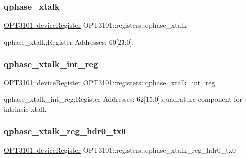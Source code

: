 \subsubsection{\texorpdfstring{qphase\+\_\+xtalk}{qphase\_xtalk}}
{\footnotesize\ttfamily \mbox{\hyperlink{class_o_p_t3101_1_1device_register}{O\+P\+T3101\+::device\+Register}} O\+P\+T3101\+::registers\+::qphase\+\_\+xtalk}



qphase\+\_\+xtalk;Register Addresses\+: 60\mbox{[}23\+:0\mbox{]}; 

\mbox{\label{class_o_p_t3101_1_1registers_ae7d09c6f98abea5bc6b0712eb5218453}} 
\subsubsection{\texorpdfstring{qphase\+\_\+xtalk\+\_\+int\+\_\+reg}{qphase\_xtalk\_int\_reg}}
{\footnotesize\ttfamily \mbox{\hyperlink{class_o_p_t3101_1_1device_register}{O\+P\+T3101\+::device\+Register}} O\+P\+T3101\+::registers\+::qphase\+\_\+xtalk\+\_\+int\+\_\+reg}



qphase\+\_\+xtalk\+\_\+int\+\_\+reg;Register Addresses\+: 62\mbox{[}15\+:0\mbox{]};quadrature component for intrinsic xtalk 

\mbox{\label{class_o_p_t3101_1_1registers_a37008e1b0c91614c3aa483d683d20f93}} 
\subsubsection{\texorpdfstring{qphase\+\_\+xtalk\+\_\+reg\+\_\+hdr0\+\_\+tx0}{qphase\_xtalk\_reg\_hdr0\_tx0}}
{\footnotesize\ttfamily \mbox{\hyperlink{class_o_p_t3101_1_1device_register}{O\+P\+T3101\+::device\+Register}} O\+P\+T3101\+::registers\+::qphase\+\_\+xtalk\+\_\+reg\+\_\+hdr0\+\_\+tx0}



